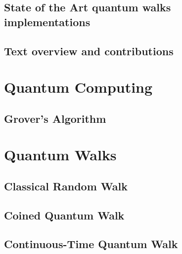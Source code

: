 \documentclass[
oneside,
11pt, a4paper,
footinclude=true,
headinclude=true,
cleardoublepage=empty
]{scrbook}
\begin{document}
\section{State of the Art quantum walks implementations}
\section{Text overview and contributions}

\chapter{Quantum Computing}
\section{Grover's Algorithm}\label{chapGrover}


\chapter{Quantum Walks}
\section{Classical Random Walk}\label{classicalWalk}

\section{Coined Quantum Walk}\label{coinedwalk}

\section{Continuous-Time Quantum Walk}\label{contwalk}

\end{document}
